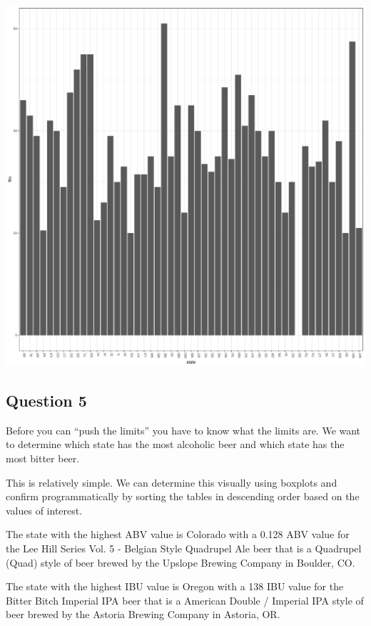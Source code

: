 \documentclass[]{article}
\begin{document}
\begin{center}\includegraphics{Analysis_Final_files/figure-latex/unnamed-chunk-17-2} \end{center}

\subsection{Question 5}\label{question-5}

Before you can ``push the limits'' you have to know what the limits are.
We want to determine which state has the most alcoholic beer and which
state has the most bitter beer.

This is relatively simple. We can determine this visually using boxplots
and confirm programmatically by sorting the tables in descending order
based on the values of interest.

The state with the highest ABV value is Colorado with a 0.128 ABV value
for the Lee Hill Series Vol. 5 - Belgian Style Quadrupel Ale beer that
is a Quadrupel (Quad) style of beer brewed by the Upslope Brewing
Company in Boulder, CO.

The state with the highest IBU value is Oregon with a 138 IBU value for
the Bitter Bitch Imperial IPA beer that is a American Double / Imperial
IPA style of beer brewed by the Astoria Brewing Company in Astoria, OR.
\end{document}
